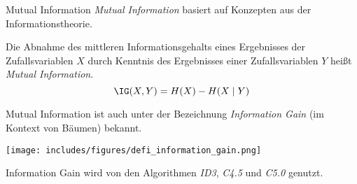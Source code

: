 \begin{defi}{Mutual Information}
    \emph{Mutual Information} basiert auf Konzepten aus der Informationstheorie.

    Die Abnahme des mittleren Informationsgehalts eines Ergebnisses der Zufallsvariablen $X$ durch Kenntnis des Ergebnisses einer Zufallsvariablen $Y$ heißt \emph{Mutual Information}.
    \[
        \IG(X, Y) = H(X) - H(X \mid Y)
    \]

    Mutual Information ist auch unter der Bezeichnung \emph{Information Gain} (im Kontext von Bäumen) bekannt.

    \begin{center}
        \texttt{[image: includes/figures/defi\_information\_gain.png]}
    \end{center}

    Information Gain wird von den Algorithmen \emph{ID3}, \emph{C4.5} und \emph{C5.0} genutzt.
\end{defi}

